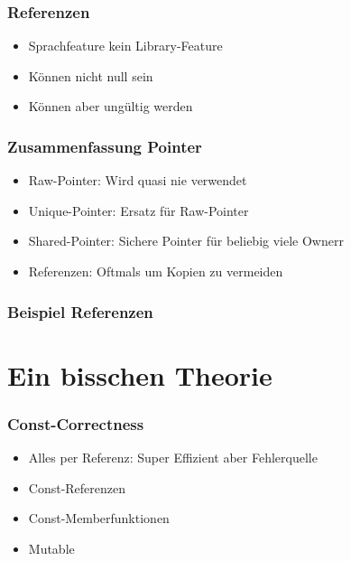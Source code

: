 \documentclass[aspectratio=169]{beamer}
\begin{document}
\begin{frame}
    \frametitle{Referenzen}
    \begin{itemize}
        \item Sprachfeature kein Library-Feature
        \item Können nicht null sein
        \item Können aber ungültig werden
    \end{itemize}
\end{frame}

\begin{frame}
    \frametitle{Zusammenfassung Pointer}
    \begin{itemize}
        \item Raw-Pointer: Wird quasi nie verwendet
        \item Unique-Pointer: Ersatz für Raw-Pointer
        \item Shared-Pointer: Sichere Pointer für beliebig viele Ownerr
        \item Referenzen: Oftmals um Kopien zu vermeiden
    \end{itemize}
\end{frame}

\begin{frame}
    \frametitle{Beispiel Referenzen}
\end{frame}

\section{Ein bisschen Theorie}

\begin{frame}
    \frametitle{Const-Correctness}
    \begin{itemize}
        \item Alles per Referenz: Super Effizient aber Fehlerquelle
        \item Const-Referenzen
        \item Const-Memberfunktionen
        \item Mutable
    \end{itemize}
\end{frame}
\end{document}
